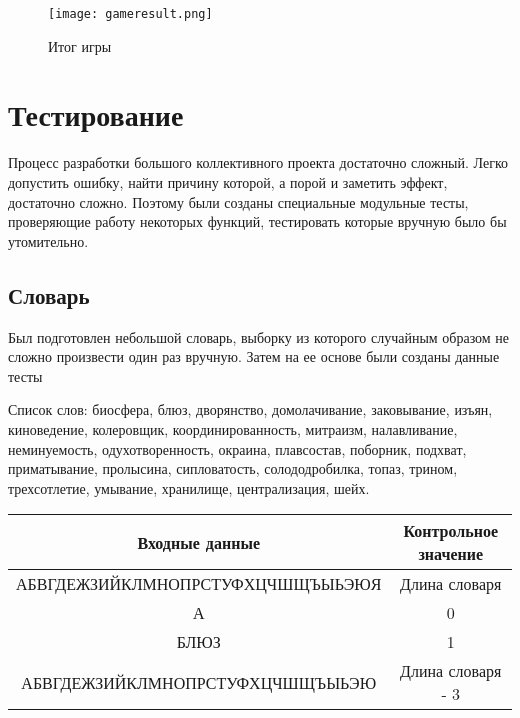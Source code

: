 \documentclass[a4paper,14pt]{article}
\begin{document}
	\begin{figure}[bhtp]
		\centering
		\texttt{[image: gameresult.png]}
		\caption{Итог игры}\label{img:gameresult}
		\label{img:endGame}
	\end{figure}
\section{Тестирование}
	Процесс разработки большого коллективного проекта достаточно сложный.
	Легко допустить ошибку, найти причину которой, а порой и заметить эффект, достаточно сложно. Поэтому были созданы специальные модульные тесты, проверяющие работу некоторых функций, тестировать которые вручную было бы утомительно.
	
	\subsection{Словарь}
	Был подготовлен небольшой словарь, выборку из которого случайным образом не сложно произвести один раз вручную.
	Затем на ее основе были созданы данные тесты
	
	Список слов: биосфера, блюз, дворянство, домолачивание, заковывание, изъян, киноведение, колеровщик, координированность, митраизм, налавливание, неминуемость, одухотворенность, окраина, плавсостав, поборник, подхват, приматывание, пролысина, сипловатость, солододробилка, топаз, трином, трехсотлетие, умывание, хранилище, централизация, шейх.
	\begin{table}[!h]
		\begin{center}
		\begin{flushleft}
		\end{flushleft}
		
		\begin{tabular}{|c|c|}
			\hline
			         Входные данные          & Контрольное значение \\ \hline
			АБВГДЕЖЗИЙКЛМНОПРСТУФХЦЧШЩЪЫЬЭЮЯ &    Длина словаря     \\ \hline
			               А                 &          0           \\ \hline
			              БЛЮЗ               &          1           \\ \hline
			АБВГДЕЖЗИЙКЛМНОПРСТУФХЦЧШЩЪЫЬЭЮ  &  Длина словаря - 3   \\ \hline
		\end{tabular}
		\end{center}
	\end{table}
\end{document}
